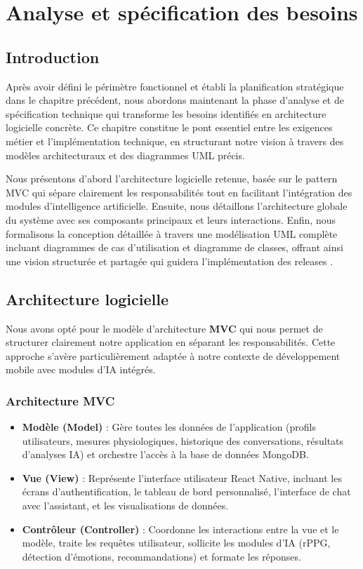 \chapter{Analyse et spécification des besoins}
\begingroup
{}
\localtableofcontents
\endgroup
\newpage
\section{Introduction}
 Après avoir défini le périmètre fonctionnel et établi la planification stratégique dans le chapitre précédent, nous abordons maintenant la phase d'analyse et de spécification technique qui transforme les besoins identifiés en architecture logicielle concrète. Ce chapitre constitue le pont essentiel entre les exigences métier et l'implémentation technique, en structurant notre vision à travers des modèles architecturaux et des diagrammes UML précis.

Nous présentons d'abord l'architecture logicielle retenue, basée sur le pattern MVC qui sépare clairement les responsabilités tout en facilitant l'intégration des modules d'intelligence artificielle. Ensuite, nous détaillons l'architecture globale du système avec ses composants principaux et leurs interactions. Enfin, nous formalisons la conception détaillée à travers une modélisation UML complète incluant diagrammes de cas d'utilisation et diagramme de classes, offrant ainsi une vision structurée et partagée qui guidera l'implémentation des releases .
\section{Architecture logicielle}
Nous avons opté pour le modèle d'architecture \textbf{MVC}  qui nous permet de structurer clairement notre application en séparant les responsabilités. Cette approche s'avère particulièrement adaptée à notre contexte de développement mobile avec modules d'IA intégrés.

\subsection{Architecture MVC}
\begin{itemize}
    \item \textbf{Modèle (Model)} : Gère toutes les données de l'application (profils utilisateurs, mesures physiologiques, historique des conversations, résultats d'analyses IA) et orchestre l'accès à la base de données MongoDB.
    \item \textbf{Vue (View)} : Représente l'interface utilisateur React Native, incluant les écrans d'authentification, le tableau de bord personnalisé, l'interface de chat avec l'assistant, et les visualisations de données.
    \item \textbf{Contrôleur (Controller)} : Coordonne les interactions entre la vue et le modèle, traite les requêtes utilisateur, sollicite les modules d'IA (rPPG, détection d'émotions, recommandations) et formate les réponses.
\end{itemize}

